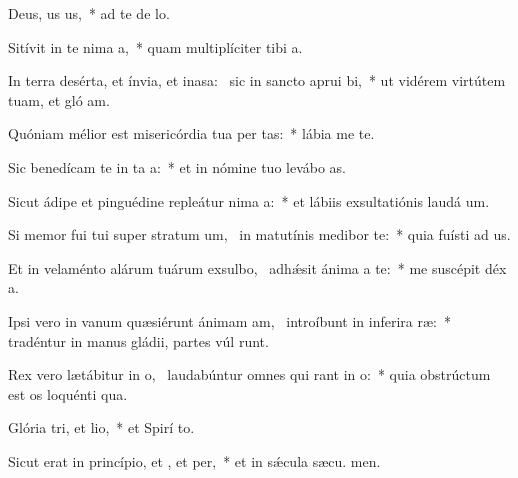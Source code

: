 \item Deus, us us,~* ad te de  lo.
\item Sitívit in te nima a,~* quam multiplíciter tibi  a.
\item In terra desérta, et ínvia, et inasa:~\pscross{} sic in sancto aprui bi,~* ut vidérem virtútem tuam, et gló am.
\item Quóniam mélior est misericórdia tua per tas:~* lábia me  te.
\item Sic benedícam te in ta a:~* et in nómine tuo levábo  as.
\item Sicut ádipe et pinguédine repleátur nima a:~* et lábiis exsultatiónis laudá  um.
\item Si memor fui tui super stratum um,~\pscross{} in matutínis medibor  te:~* quia fuísti ad us.
\item Et in velaménto alárum tuárum exsulbo,~\pscross{} adhǽsit ánima a  te:~* me suscépit déx a.
\item Ipsi vero in vanum quæsiérunt ánimam am,~\pscross{} introíbunt in inferira ræ:~* tradéntur in manus gládii, partes vúl runt.
\item Rex vero lætábitur in o,~\pscross{} laudabúntur omnes qui rant in o:~* quia obstrúctum est os loquénti qua.
\item Glória tri, et lio,~* et Spirí to.
\item Sicut erat in princípio, et , et per,~* et in sǽcula sæcu. men.
